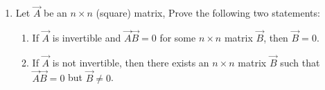 \renewcommand{\theequation}{\theenumi}
\renewcommand{\thefigure}{\theenumi}
\begin{enumerate}[label=\thesubsection.\arabic*.,ref=\thesubsection.\theenumi]
%
\item Let $\vec{A}$ be an $n \times n$ (square) matrix, Prove the following two statements:
 \begin{enumerate}
   \item If $\vec{A}$ is invertible and $\vec{A}\vec{B}=0$ for some $n \times n$ matrix $\vec{B}$, then $\vec{B}=0$.
   \item If $\vec{A}$ is not invertible, then there exists an $n \times n$ matrix $\vec{B}$ such that $\vec{A}\vec{B}=0$ but $\vec{B} \not= 0$.
 \end{enumerate}

%
\solution

\end{enumerate}



